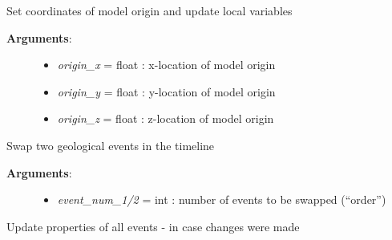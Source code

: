 \documentclass[a4paper,10pt,english]{sphinxmanual}
\begin{document}
\begin{fulllineitems}

\begin{fulllineitems}
\label{pynoddy:pynoddy.history.NoddyHistory.set_origin}
Set coordinates of model origin and update local variables
\begin{description}
\item[{\textbf{Arguments}:}] \leavevmode\begin{itemize}
\item {} 
\emph{origin\_x} = float : x-location of model origin

\item {} 
\emph{origin\_y} = float : y-location of model origin

\item {} 
\emph{origin\_z} = float : z-location of model origin

\end{itemize}

\end{description}

\end{fulllineitems}


\begin{fulllineitems}
\label{pynoddy:pynoddy.history.NoddyHistory.swap_events}
Swap two geological events in the timeline
\begin{description}
\item[{\textbf{Arguments}:}] \leavevmode\begin{itemize}
\item {} 
\emph{event\_num\_1/2} = int : number of events to be swapped (``order'')

\end{itemize}

\end{description}

\end{fulllineitems}


\begin{fulllineitems}
\label{pynoddy:pynoddy.history.NoddyHistory.update_all_event_properties}
Update properties of all events - in case changes were made


\end{fulllineitems}
\end{fulllineitems}
\end{document}
